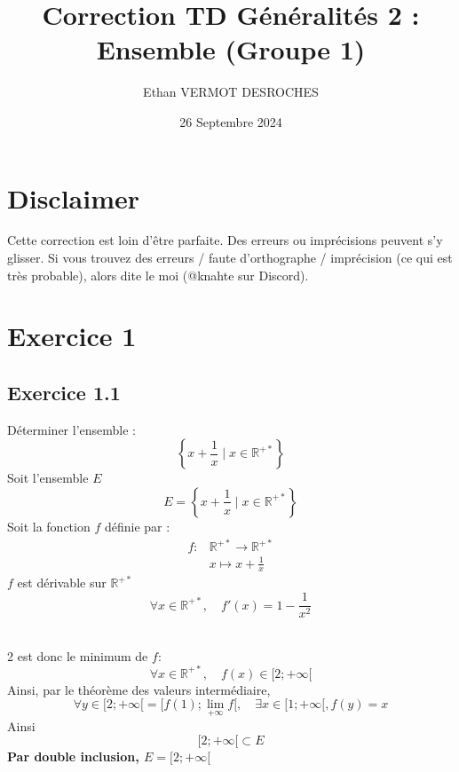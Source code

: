 \documentclass[a4paper,12pt]{article}
\title{\textbf{Correction TD Généralités 2 : Ensemble (Groupe 1)}}
\author{Ethan VERMOT DESROCHES}
\date{26 Septembre 2024}
\begin{document}
\maketitle
\thispagestyle{fancy}
\section*{Disclaimer}
Cette correction est loin d'être parfaite. Des erreurs ou imprécisions peuvent s'y glisser. Si vous trouvez des erreurs / faute d’orthographe / imprécision (ce qui est très probable), alors dite le moi (@knahte sur Discord).
\tableofcontents
\newpage

\section{Exercice 1}
\subsection{Exercice 1.1}
Déterminer l'ensemble :
\[
\left\{ x + \frac{1}{x} \mid x \in \mathbb{R}^{+*} \right\}
\]
Soit l'ensemble $E$
\[
E = \left\{ x + \frac{1}{x} \mid x \in \mathbb{R}^{+*} \right\}
\]
Soit la fonction $f$ définie par :
\[
\begin{aligned}
f :& \mathbb{R}^{+*} \to \mathbb{R}^{+*}
\\
& x \mapsto x + \frac{1}{x}
\end{aligned}
\]
$f$ est dérivable sur $\mathbb{R}^{+*}$
\[
\forall x \in \mathbb{R}^{+*}, \quad f'(x) = 1 - \frac{1}{x^2}
\]

\\
2 est donc le minimum de $f$:
\[
\forall x \in \mathbb{R}^{+*}, \quad f(x) \in [ 2; +\infty[
\]
Ainsi, par le théorème des valeurs intermédiaire,
\[
\forall y \in[ 2; +\infty[ = [ f(1); \lim_{+\infty} f [ ,\quad \exists x \in [ 1; +\infty[, f(y) = x
\]
Ainsi
\[
[ 2 ; + \infty [ \subset E
\]
\textbf{Par double inclusion, $E = [ 2 ; + \infty [$}
\end{document}
